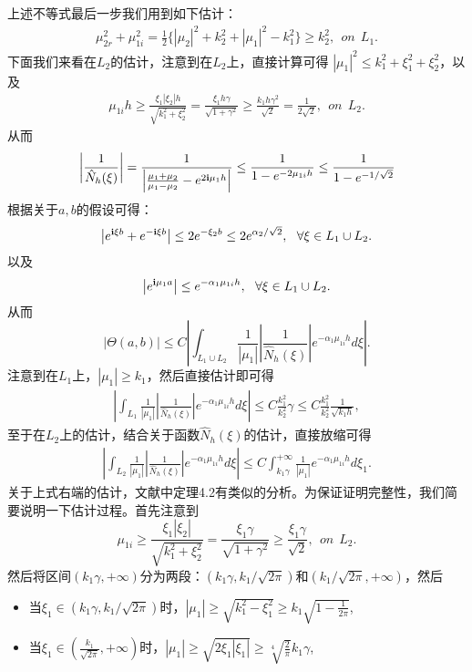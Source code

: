 上述不等式最后一步我们用到如下估计：
\begin{eqnarray*}
\mu_{2r}^2+\mu_{1i}^2=\frac{1}{2}\{|\mu_2|^2+k_2^2+|\mu_1|^2-k_1^2\}\geq k_2^2,\ \ on \ \ L_1.
\end{eqnarray*}
下面我们来看在$L_2$的估计，注意到在$L_2$上，直接计算可得
$|\mu_1|^2\leq k_1^2+\xi_1^2+\xi_2^2$，以及
\begin{eqnarray*}
\mu_{1i}h\geq\frac{\xi_1|\xi_2|h}{\sqrt{k_1^2+\xi_2^2}}=\frac{\xi_1h\gamma}{\sqrt{1+\gamma^2}}\geq\frac{k_1h\gamma^2}{\sqrt2}=\frac{1}{2\sqrt2}
,\ \ on \  \ L_2.
\end{eqnarray*}
从而
\begin{eqnarray*}
\left|\frac{1}{\hat N_h(\xi)}\right|=
\frac{1}{\left|\frac{\mu_1+\mu_2}{\mu_1-\mu_2}-e^{2\mathbf{i}\mu_1h}\right|}\leq
\frac{1}{1-e^{-2\mu_{1i}h}}\leq\frac{1}{1-e^{-1/\sqrt2}}
\end{eqnarray*}
根据关于$a,b$的假设可得：
$$
\left|e^{\mathbf{i}\xi b}+e^{-\mathbf{i}\xi b}\right|\leq2e^{-\xi_2 b}\leq 2e^{\alpha_2/\sqrt2},\ \ \forall\xi\in L_1\cup L_2.
$$
以及
$$\left|e^{\mathbf{i}\mu_1 a}\right|\leq e^{-\alpha_1\mu_{1i}h},\ \ \forall\xi\in L_1\cup L_2.$$
从而
\begin{equation}
\left|\Theta(a,b)\right|\leq C\left|\int_{L_1\cup L_2}\frac{1}{|\mu_1|}\left|\frac{1}{\hat N_h(\xi)}\right|e^{-\alpha_1\mu_{1i}h}d\xi\right|.
\end{equation}
注意到在$L_1$上，$|\mu_1|\geq k_1$，然后直接估计即可得
\begin{eqnarray*}
\left|\int_{L_1}\frac{1}{|\mu_1|}\left|\frac{1}{\hat N_h(\xi)}\right|e^{-\alpha_1\mu_{1i}h}d\xi\right|
\leq C\frac{k_1^2}{k_2^2}\gamma\leq C\frac{k_1^2}{k_2^2}\frac{1}{\sqrt{k_1h}},
\end{eqnarray*}
至于在$L_2$上的估计，结合关于函数$\hat N_h(\xi)$的估计，直接放缩可得
\begin{eqnarray*}
\left|\int_{L_2}\frac{1}{|\mu_1|}\left|\frac{1}{\hat N_h(\xi)}\right|e^{-\alpha_1\mu_{1i}h}d\xi\right|
\leq C\int_{k_1\gamma}^{+\infty}\frac{1}{|\mu_1|}e^{-\alpha_1\mu_{1i}h}d\xi_1.
\end{eqnarray*}
关于上式右端的估计，文献\cite{ch_cw}中定理4.2有类似的分析。为保证证明完整性，我们简要说明一下估计过程。首先注意到
\begin{equation*}
 \mu_{1i}\geq\frac{\xi_1|\xi_2|}{\sqrt{k_1^2+\xi_2^2}}=\frac{\xi_1\gamma}{\sqrt{1+\gamma^2}}\geq\frac{\xi_1\gamma}{\sqrt2}
,\ \ on \  \ L_2.
\end{equation*}
然后将区间$(k_1\gamma,+\infty)$分为两段：$(k_1\gamma,k_1/\sqrt{2\pi})$和$(k_1/\sqrt{2\pi},+\infty)$，然后
\begin{itemize}
  \item 当$\xi_1\in(k_1\gamma,k_1/\sqrt{2\pi})$时，$|\mu_1|\geq\sqrt{k_1^2-\xi_1^2}\geq k_1\sqrt{1-\frac{1}{2\pi}}$,
  \item 当$\xi_1\in(\frac{k_1}{\sqrt{2\pi}},+\infty)$时，$|\mu_1|\geq\sqrt{2{\xi_1|\xi_1|}}\geq\sqrt[4]{\frac{2}{\pi}}k_1\gamma$,
\end{itemize}
